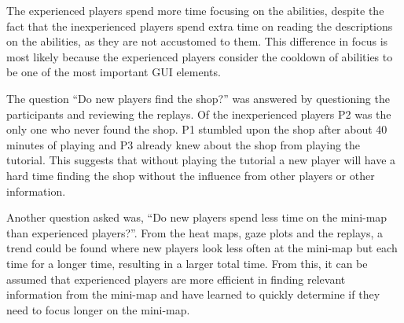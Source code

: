 \documentclass[notitlepage]{report}
\begin{document}
The experienced players spend more time focusing on the abilities, despite the fact that the inexperienced players spend extra time on reading the descriptions on the abilities, as they are not accustomed to them. This difference in focus is most likely because the experienced players consider the cooldown of abilities to be one of the most important GUI elements.

The question ``Do new players find the shop?'' was answered by questioning the participants and reviewing the replays. Of the inexperienced players P2 was the only one who never found the shop. P1 stumbled upon the shop after about 40 minutes of playing and P3 already knew about the shop from playing the tutorial. This suggests that without playing the tutorial a new player will have a hard time finding the shop without the influence from other players or other information.

Another question asked was, ``Do new players spend less time on the mini-map than experienced players?''. From the heat maps, gaze plots and the replays, a trend could be found where new players look less often at the mini-map but each time for a longer time, resulting in a larger total time. From this, it can be assumed that experienced players are more efficient in finding relevant information from the mini-map and have learned to quickly determine if they need to focus longer on the mini-map.
\end{document}
